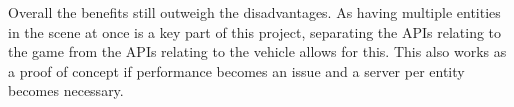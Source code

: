 Overall the benefits still outweigh the disadvantages. As having multiple entities in the scene at once is a key part of this project, separating the APIs relating to the game from the APIs relating to the vehicle allows for this. This also works as a proof of concept if performance becomes an issue and a server per entity becomes necessary. 





